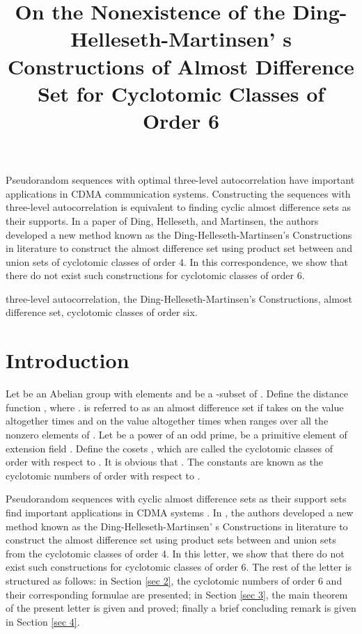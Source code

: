 \documentclass[letter]{ieice}
\title{On the Nonexistence of the Ding-Helleseth-Martinsen' s Constructions of Almost Difference Set for Cyclotomic Classes of Order 6}
\begin{document}
\maketitle
\begin{summary}
Pseudorandom sequences with optimal three-level autocorrelation have important applications in CDMA communication systems. Constructing the sequences with three-level autocorrelation is equivalent to finding cyclic almost difference sets as their supports. In a paper of Ding, Helleseth, and Martinsen, the authors developed a new method known as the Ding-Helleseth-Martinsen’s Constructions in literature to construct the almost difference set using product set between  and union sets of cyclotomic classes of order 4. In this correspondence, we show that there do not exist such constructions for cyclotomic classes of order 6.
\end{summary}
\begin{keywords}
three-level autocorrelation, the Ding-Helleseth-Martinsen’s Constructions, almost difference set, cyclotomic classes of order six.
\end{keywords}

\section{Introduction}\label{sec 1}
Let   be an Abelian group with  elements and  be a -subset of . Define the distance function , where .  is referred to as an  almost difference set if  takes on the value  altogether  times and on the value  altogether  times when   ranges over all the nonzero elements of . Let  be a power of an odd prime,  be a primitive element of extension field . Define the cosets , which are called the cyclotomic classes of order  with respect to . It is obvious that . The constants  are known as the cyclotomic numbers of order  with respect to .

Pseudorandom sequences with cyclic almost difference sets as their support sets find important applications in CDMA systems \cite{ar05,ar06}. In \cite{ar03,ar06}, the authors developed a new method known as the Ding-Helleseth-Martinsen’ s Constructions in literature to construct the almost difference set using product sets between  and union sets from the cyclotomic classes of order 4. In this letter, we show that there do not exist such constructions for cyclotomic classes of order 6. The rest of the letter is structured as follows: in Section \ref{sec 2}, the cyclotomic numbers of order 6 and their corresponding formulae are presented; in Section \ref{sec 3}, the main theorem of the present letter is given and proved; finally a brief concluding remark is given in Section \ref{sec 4}.
\end{document}
